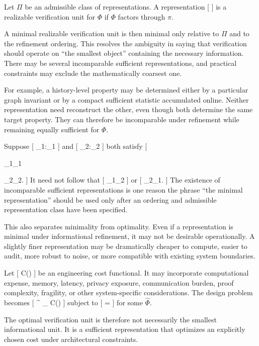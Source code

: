 \documentclass[11pt]{article}
\begin{document}
\begin{definition}
Let $\Pi$ be an admissible class of representations. A representation
[
\pi\in\Pi
]
is a realizable verification unit for $\Phi$ if $\Phi$ factors through $\pi$.
\end{definition}

A minimal realizable verification unit is then minimal only relative to $\Pi$ and to the refinement ordering. This resolves the ambiguity in saying that verification should operate on ``the smallest object'' containing the necessary information. There may be several incomparable sufficient representations, and practical constraints may exclude the mathematically coarsest one.

For example, a history-level property may be determined either by a particular graph invariant or by a compact sufficient statistic accumulated online. Neither representation need reconstruct the other, even though both determine the same target property. They can therefore be incomparable under refinement while remaining equally sufficient for $\Phi$.

Suppose
[
\pi_1:\rightarrow{}_1
]
and
[
\pi_2:\rightarrow{}_2
]
both satisfy
[
\Phi

\widehat{\Phi}_1\circ\pi_1

\widehat{\Phi}_2\circ\pi_2.
]
It need not follow that
[
\pi_1\succeq\pi_2
]
or
[
\pi_2\succeq\pi_1.
]
The existence of incomparable sufficient representations is one reason the phrase ``the minimal representation'' should be used only after an ordering and admissible representation class have been specified.

This also separates minimality from optimality. Even if a representation is minimal under informational refinement, it may not be desirable operationally. A slightly finer representation may be dramatically cheaper to compute, easier to audit, more robust to noise, or more compatible with existing system boundaries.

Let
[
C(\pi)
]
be an engineering cost functional. It may incorporate computational expense, memory, latency, privacy exposure, communication burden, proof complexity, fragility, or other system-specific considerations. The design problem becomes
[
\pi^\star
\in
\arg\min_{\pi\in\Pi}
C(\pi)
]
subject to
[
\Phi=\widehat{\Phi}\circ\pi
]
for some $\widehat{\Phi}$.

The optimal verification unit is therefore not necessarily the smallest informational unit. It is a sufficient representation that optimizes an explicitly chosen cost under architectural constraints.
\end{document}
